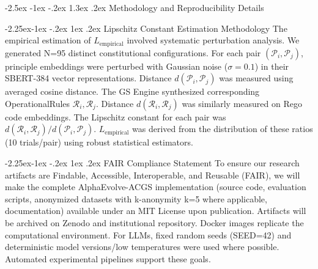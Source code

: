 \documentclass[manuscript,screen,9pt]{acmart}
\makeatletter
\renewcommand\section{\@startsection{section}{1}{\z@}%
  {-2.5ex \@plus -1ex \@minus -.2ex}%
  {1.3ex \@plus.2ex}%
  {\normalfont\Large\bfseries}}
\renewcommand\subsection{\@startsection{subsection}{2}{\z@}%
  {-2.25ex\@plus -1ex \@minus -.2ex}%
  {1ex \@plus .2ex}%
  {\normalfont\large\bfseries}}
\makeatother
\begin{document}
\section{Methodology and Reproducibility Details}
\label{app:methodology}

\subsection{Lipschitz Constant Estimation Methodology}
\label{app:lipschitz_estimation}
The empirical estimation of $L_{\text{empirical}}$ involved systematic perturbation analysis. We generated N=95 distinct constitutional configurations. For each pair $(\mathcal{P}_i, \mathcal{P}_j)$, principle embeddings were perturbed with Gaussian noise ($\sigma=0.1$) in their SBERT-384 vector representations. Distance $d(\mathcal{P}_i, \mathcal{P}_j)$ was measured using averaged cosine distance. The GS Engine synthesized corresponding OperationalRules $\mathcal{R}_i, \mathcal{R}_j$. Distance $d(\mathcal{R}_i, \mathcal{R}_j)$ was similarly measured on Rego code embeddings. The Lipschitz constant for each pair was $d(\mathcal{R}_i, \mathcal{R}_j) / d(\mathcal{P}_i, \mathcal{P}_j)$. $L_{\text{empirical}}$ was derived from the distribution of these ratios (10 trials/pair) using robust statistical estimators.

\subsection{FAIR Compliance Statement}
\label{app:fair_compliance}
To ensure our research artifacts are Findable, Accessible, Interoperable, and Reusable (FAIR), we will make the complete AlphaEvolve-ACGS implementation (source code, evaluation scripts, anonymized datasets with k-anonymity k=5 where applicable, documentation) available under an MIT License upon publication. Artifacts will be archived on Zenodo and institutional repository. Docker images replicate the computational environment. For LLMs, fixed random seeds (SEED=42) and deterministic model versions/low temperatures were used where possible. Automated experimental pipelines support these goals.
\end{document}
